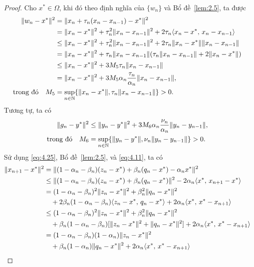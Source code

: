 \documentclass[11pt,a4paper]{article}
\theoremstyle{plain}
\theoremstyle{definition}
\theoremstyle{remark}
\numberwithin{equation}{section}
\newcommand{\inp}[2]{\langle #1,\,#2\rangle}
\newcommand{\nm}[1]{\lVert #1\rVert}
\newcommand{\N}{\mathbb{N}}
\begin{document}
\begin{proof}
Cho $x^{*}\in\Omega$, khi đó theo định nghĩa của $\{w_n\}$ và Bổ đề~\ref{lem:2.5}, ta được
\begin{align}
\nm{w_n-x^{*}}^2 &= \nm{x_n+\tau_n(x_n-x_{n-1})-x^{*}}^2\notag\\
&= \nm{x_n-x^{*}}^2+\tau_n^2\nm{x_n-x_{n-1}}^2+2\tau_n\inp{x_n-x^{*}}{x_n-x_{n-1}}\notag\\
&\le \nm{x_n-x^{*}}^2+\tau_n^2\nm{x_n-x_{n-1}}^2+2\tau_n\nm{x_n-x^{*}}\nm{x_n-x_{n-1}}\notag\\
&= \nm{x_n-x^{*}}^2+\tau_n\nm{x_n-x_{n-1}}(\tau_n\nm{x_n-x_{n-1}}+2\nm{x_n-x^{*}})\notag\\
&\le \nm{x_n-x^{*}}^2+3M_5\tau_n\nm{x_n-x_{n-1}}\notag\\
&= \nm{x_n-x^{*}}^2+3M_5\alpha_n\frac{\tau_n}{\alpha_n}\nm{x_n-x_{n-1}},\notag\\
\text{trong đó}\quad M_5 &= \sup_{n\in\N}\{\nm{x_n-x^{*}},\tau_n\nm{x_n-x_{n-1}}\}>0. \label{eq:4.25}
\end{align}
Tương tự, ta có
\begin{align}
\nm{g_n-y^{*}}^2 &\le \nm{y_n-y^{*}}^2+3M_6\alpha_n\frac{\nu_n}{\alpha_n}\nm{y_n-y_{n-1}},\notag\\
\text{trong đó}\quad M_6 &= \sup_{n\in\N}\{\nm{y_n-y^{*}},\nu_n\nm{y_n-y_{n-1}}\}>0. \label{eq:4.26}
\end{align}
Sử dụng \eqref{eq:4.25}, Bổ đề~\ref{lem:2.5}, và \eqref{eq:4.11}, ta có
\begin{align}
\nm{x_{n+1}-x^{*}}^2 &= \nm{(1-\alpha_n-\beta_n)(z_n-x^{*})+\beta_n(q_n-x^{*})-\alpha_n x^{*}}^2\notag\\
&\le \nm{(1-\alpha_n-\beta_n)(z_n-x^{*})+\beta_n(q_n-x^{*})}^2-2\alpha_n\inp{x^{*}}{x_{n+1}-x^{*}}\notag\\
&= (1-\alpha_n-\beta_n)^2\nm{z_n-x^{*}}^2+\beta_n^2\nm{q_n-x^{*}}^2\notag\\
&\quad +2\beta_n(1-\alpha_n-\beta_n)\inp{z_n-x^{*}}{q_n-x^{*}}+2\alpha_n\inp{x^{*}}{x^{*}-x_{n+1}}\notag\\
&\le (1-\alpha_n-\beta_n)^2\nm{z_n-x^{*}}^2+\beta_n^2\nm{q_n-x^{*}}^2\notag\\
&\quad +\beta_n(1-\alpha_n-\beta_n)[\nm{z_n-x^{*}}^2+\nm{q_n-x^{*}}^2]+2\alpha_n\inp{x^{*}}{x^{*}-x_{n+1}}\notag\\
&= (1-\alpha_n-\beta_n)(1-\alpha_n)\nm{z_n-x^{*}}^2\notag\\
&\quad +\beta_n(1-\alpha_n)\nm{q_n-x^{*}}^2+2\alpha_n\inp{x^{*}}{x^{*}-x_{n+1}}\notag\\

\end{align}
\end{proof}
\end{document}
